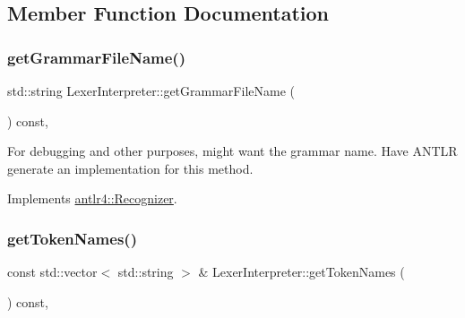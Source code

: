 \subsection{Member Function Documentation}
\mbox{\label{classantlr4_1_1LexerInterpreter_a9f2f177e3a27be86cbb8b84d7bd3ca37}} 
\subsubsection{\texorpdfstring{get\+Grammar\+File\+Name()}{getGrammarFileName()}}
{\footnotesize\ttfamily std\+::string Lexer\+Interpreter\+::get\+Grammar\+File\+Name (\begin{DoxyParamCaption}{ }\end{DoxyParamCaption}) const\hspace{0.3cm}{\ttfamily [override]}, {\ttfamily [virtual]}}



For debugging and other purposes, might want the grammar name. Have A\+N\+T\+LR generate an implementation for this method. 



Implements \hyperlink{classantlr4_1_1Recognizer_a41d77f1ad38c68b4208d26c070fd2cc7}{antlr4\+::\+Recognizer}.

\mbox{\label{classantlr4_1_1LexerInterpreter_a09dd1700a39365debf06b10af7d34da6}} 
\subsubsection{\texorpdfstring{get\+Token\+Names()}{getTokenNames()}}
{\footnotesize\ttfamily const std\+::vector$<$ std\+::string $>$ \& Lexer\+Interpreter\+::get\+Token\+Names (\begin{DoxyParamCaption}{ }\end{DoxyParamCaption}) const\hspace{0.3cm}{\ttfamily [override]}, {\ttfamily [virtual]}}

